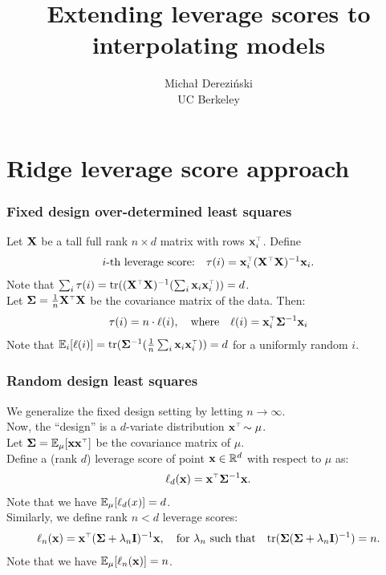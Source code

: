 \documentclass[10pt]{beamer}
\title[]{Extending leverage scores to interpolating models}
\author[]{Micha{\l} Derezi\'{n}ski\\
UC Berkeley}
\begin{document}
\begin{frame}
  \titlepage
\end{frame}

\linespread{1.3}

\section{Ridge leverage score approach}

\begin{frame}
  \frametitle{Fixed design over-determined least squares}
  Let $\mathbf X$ be a tall full rank $n\times d$ matrix with rows
  $\x_i^\top$. Define
  \begin{align*}
    \text{$i$-th leverage score:}\quad \tau(i) = \x_i^\top(\X^\top\X)^{-1}\x_i.
  \end{align*}
  Note that $\sum_i\tau(i) =
  \tr((\X^\top\X)^{-1}(\sum_i\x_i\x_i^\top))=d$.\\[5mm]
Let $\Sigmab = \frac1n\X^\top\X$ be the covariance matrix of the
data. Then:
\begin{align*}
  \tau(i) = n\cdot \ell(i),\quad\text{where}\quad \ell(i) = \x_i^\top\Sigmab^{-1}\x_i
\end{align*}
Note that $\E_i[\ell(i)]=\tr(\Sigmab^{-1}(\frac1n\sum_i\x_i\x_i^\top))= d$
for a uniformly random $i$.
\end{frame}

\begin{frame}
  \frametitle{Random design least squares}
  We generalize the fixed design setting by letting $n\rightarrow
  \infty$.\\
  Now, the ``design'' is a $d$-variate distribution $\x^\top\!\sim\mu$.\\
  Let $\Sigmab=\E_\mu[\x\x^\top]$ be the covariance matrix of $\mu$.\\[5mm]
Define a (rank $d$) leverage score of point $\mathbf x\in\mathbb R^d$ with respect to $\mu$ as:
\begin{align*}
  \ell_d(\x) = \x^\top\Sigmab^{-1}\x.
\end{align*}
Note that we have $\mathbb E_\mu[\ell_d(x)] = d$.\\[4mm]
Similarly, we define rank $n<d$ leverage scores:
\begin{align*}
  \ell_n(\x) = \x^\top(\Sigmab+\lambda_n\I)^{-1}\x,\quad\text{for
  $\lambda_n$ such that}\quad
  \tr(\Sigmab(\Sigmab+\lambda_n\I)^{-1}) = n.
\end{align*}
Note that we have $\mathbb E_\mu[\ell_n(\mathbf x)]= n$.
\end{frame}
\end{document}
